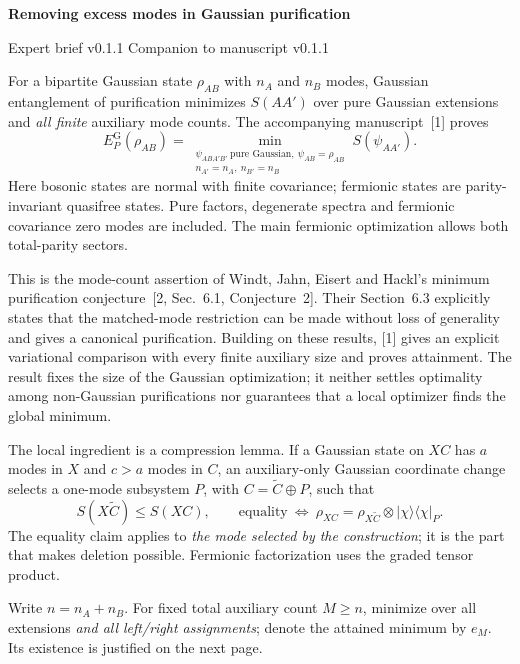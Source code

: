 \documentclass[11pt,a4paper]{article}
\newcommand{\EPG}{E_P^{\mathrm G}}
\newcommand{\ket}[1]{\lvert#1\rangle}
\newcommand{\bra}[1]{\langle#1\rvert}
\newcommand{\heading}[1]{\par\vspace{5pt}{\large\bfseries #1}\par\vspace{1pt}}
\begin{document}
{\LARGE\bfseries Removing excess modes in Gaussian purification}\par
\vspace{4pt}
{\small Expert brief v0.1.1 \quad Companion to manuscript v0.1.1}

\heading{The result and its scope}
For a bipartite Gaussian state $\rho_{AB}$ with $n_A$ and $n_B$ modes, Gaussian entanglement of purification minimizes $S(AA')$ over pure Gaussian extensions and \emph{all finite} auxiliary mode counts. The accompanying manuscript~[1] proves
\begin{equation*}
\EPG(\rho_{AB})
=\min_{\substack{\psi_{ABA'B'}\ \text{pure Gaussian},\ \psi_{AB}=\rho_{AB}\\
n_{A'}=n_A,\ n_{B'}=n_B}}S(\psi_{AA'}).
\end{equation*}
Here bosonic states are normal with finite covariance; fermionic states are parity-invariant quasifree states. Pure factors, degenerate spectra and fermionic covariance zero modes are included. The main fermionic optimization allows both total-parity sectors.

This is the mode-count assertion of Windt, Jahn, Eisert and Hackl's minimum purification conjecture~[2, Sec.~6.1, Conjecture~2]. Their Section~6.3 explicitly states that the matched-mode restriction can be made without loss of generality and gives a canonical purification. Building on these results, [1] gives an explicit variational comparison with every finite auxiliary size and proves attainment. The result fixes the size of the Gaussian optimization; it neither settles optimality among non-Gaussian purifications nor guarantees that a local optimizer finds the global minimum.

\heading{The key mechanism: transfer, equality, removal}
The local ingredient is a compression lemma. If a Gaussian state on $XC$ has $a$ modes in $X$ and $c>a$ modes in $C$, an auxiliary-only Gaussian coordinate change selects a one-mode subsystem $P$, with $C=\widetilde C\oplus P$, such that
\begin{equation*}
S(X\widetilde C)\le S(XC),
\qquad
\text{equality}\ \Longleftrightarrow\ 
\rho_{XC}=\rho_{X\widetilde C}\otimes\ket\chi\bra\chi_P.
\end{equation*}
The equality claim applies to \emph{the mode selected by the construction}; it is the part that makes deletion possible. Fermionic factorization uses the graded tensor product.

Write $n=n_A+n_B$. For fixed total auxiliary count $M\ge n$, minimize over all extensions \emph{and all left/right assignments}; denote the attained minimum by $e_M$. Its existence is justified on the next page.
\end{document}
